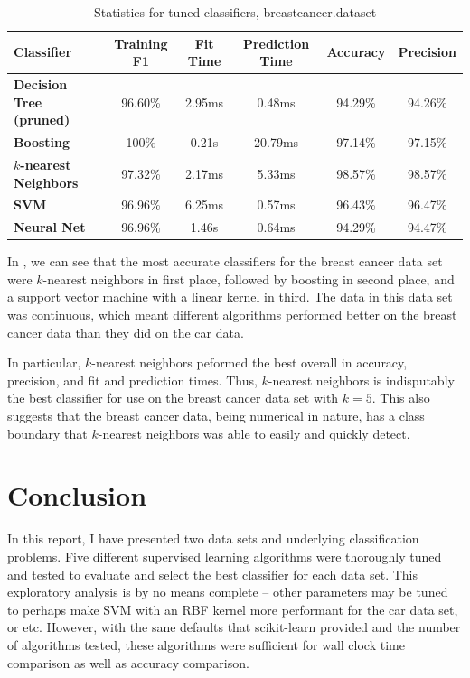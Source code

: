 \documentclass{article}
\begin{document}
    \begin{table}[h!]
    \centering
    \begin{tabular}{||l c c c c c||} 
     \hline
     \textbf{Classifier} & Training F1 & Fit Time & Prediction Time & Accuracy & Precision \\
     \hline
     \textbf{Decision Tree (pruned)} & 96.60\% & 2.95ms & 0.48ms & 94.29\% & 94.26\% \\ 
     \textbf{Boosting} & 100\% & 0.21s & 20.79ms & 97.14\% & 97.15\% \\
     \textbf{$k$-nearest Neighbors} & 97.32\% & 2.17ms & 5.33ms & 98.57\% & 98.57\% \\
     \textbf{SVM} & 96.96\% & 6.25ms & 0.57ms & 96.43\% & 96.47\% \\
     \textbf{Neural Net} & 96.96\% & 1.46s & 0.64ms & 94.29\% & 94.47\% \\
     \hline
    \end{tabular}
    \caption{Statistics for tuned classifiers, breastcancer.dataset}
    \label{tab:breastcancer-stats}
    \end{table}

    In , we can see that the most accurate classifiers for the breast cancer data set were $k$-nearest neighbors in first place, followed by boosting in second place, and a support vector machine with a linear kernel in third. The data in this data set was continuous, which meant different algorithms performed better on the breast cancer data than they did on the car data.

    In particular, $k$-nearest neighbors peformed the best overall in accuracy, precision, and fit and prediction times. Thus, $k$-nearest neighbors is indisputably the best classifier for use on the breast cancer data set with $k=5$. This also suggests that the breast cancer data, being numerical in nature, has a class boundary that $k$-nearest neighbors was able to easily and quickly detect.

    \section{Conclusion}
    In this report, I have presented two data sets and underlying classification problems. Five different supervised learning algorithms were thoroughly tuned and tested to evaluate and select the best classifier for each data set. This exploratory analysis is by no means complete -- other parameters may be tuned to perhaps make SVM with an RBF kernel more performant for the car data set, or etc. However, with the sane defaults that scikit-learn provided and the number of algorithms tested, these algorithms were sufficient for wall clock time comparison as well as accuracy comparison.
\end{document}
